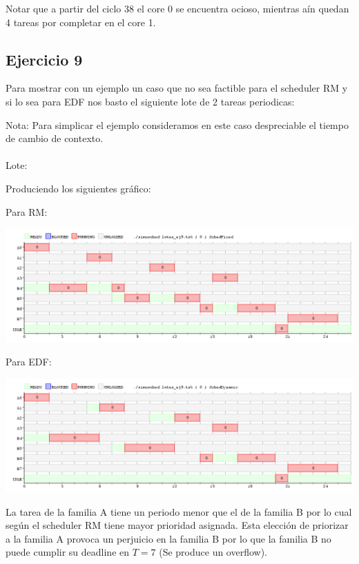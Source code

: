 Notar que a partir del ciclo 38 el core 0 se encuentra ocioso, mientras aín quedan 4 tareas por completar en el core 1.\\


\subsection{Ejercicio 9}

Para mostrar con un ejemplo un caso que no sea factible para el scheduler RM y si lo sea para EDF nos basto el siguiente lote de 2 tareas periodicas:

Nota: Para simplicar el ejemplo consideramos en este caso despreciable el tiempo de cambio de contexto.
\\
\\
Lote:


Produciendo los siguientes gráfico:

Para RM:

\begin{center}
\includegraphics[scale=0.4]{graficos/eje9_fixed.png}
\end{center}

Para EDF:

\begin{center}
\includegraphics[scale=0.4]{graficos/eje9_dynamic.png}
\end{center}

La tarea de la familia A tiene un periodo menor que el de la familia B por lo cual según el scheduler RM tiene mayor prioridad asignada. Esta elección de priorizar a la familia A provoca un perjuicio en la familia B por lo que la familia B no puede cumplir su deadline en $T=7$ (Se produce un overflow).

